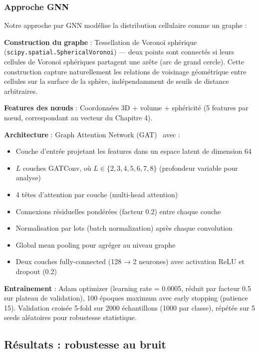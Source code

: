 \subsubsection{Approche GNN}

Notre approche par GNN modélise la distribution cellulaire comme un graphe :

\textbf{Construction du graphe} : Tessellation de Voronoï sphérique (\texttt{scipy.spatial.SphericalVoronoi}) — deux points sont connectés si leurs cellules de Voronoï sphériques partagent une arête (arc de grand cercle). Cette construction capture naturellement les relations de voisinage géométrique entre cellules sur la surface de la sphère, indépendamment de seuils de distance arbitraires.

\textbf{Features des nœuds} : Coordonnées 3D + volume + sphéricité (5 features par nœud, correspondant au vecteur du Chapitre 4).

\textbf{Architecture} : Graph Attention Network (GAT)~\cite{gatvcnn2018} avec :
\begin{itemize}
    \item Couche d'entrée projetant les features dans un espace latent de dimension 64
    \item $L$ couches GATConv, où $L \in \{2, 3, 4, 5, 6, 7, 8\}$ (profondeur variable pour analyse)
    \item 4 têtes d'attention par couche (multi-head attention)
    \item Connexions résiduelles pondérées (facteur 0.2) entre chaque couche
    \item Normalisation par lots (batch normalization) après chaque convolution
    \item Global mean pooling pour agréger au niveau graphe
    \item Deux couches fully-connected (128 → 2 neurones) avec activation ReLU et dropout (0.2)
\end{itemize}

\textbf{Entraînement} : Adam optimizer (learning rate = 0.0005, réduit par facteur 0.5 sur plateau de validation), 100 époques maximum avec early stopping (patience 15). Validation croisée 5-fold sur 2000 échantillons (1000 par classe), répétée sur 5 seeds aléatoires pour robustesse statistique.

\subsection{Résultats : robustesse au bruit}

